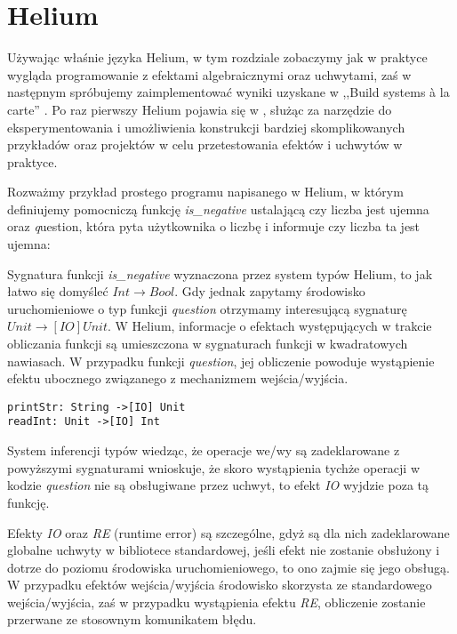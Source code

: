 \section{Helium}

\lstset{style=helium}

Używając właśnie języka Helium, w tym rozdziale zobaczymy jak w praktyce wygląda programowanie z efektami algebraicznymi oraz uchwytami, zaś w następnym spróbujemy zaimplementować wyniki uzyskane w ,,Build systems {\`a} la carte'' \cite{mokhov2018build, mokhov2020build}. Po raz pierwszy Helium pojawia się w \cite{biernacki2019abstracting}, służąc za narzędzie do eksperymentowania i umożliwienia konstrukcji bardziej skomplikowanych przykładów oraz projektów w celu przetestowania efektów i uchwytów w praktyce.

Rozważmy przykład prostego programu napisanego w Helium, w którym definiujemy pomocniczą funkcję \textit{is\_negative} ustalającą czy liczba jest ujemna oraz {\textit question}, która pyta użytkownika o liczbę i informuje czy liczba ta jest ujemna:



Sygnatura funkcji \textit{is\_negative} wyznaczona przez system typów Helium, to jak łatwo się domyśleć \(\mathit{Int \rightarrow Bool}\). Gdy jednak zapytamy środowisko uruchomieniowe o typ funkcji \textit{question} otrzymamy interesującą sygnaturę \(\mathit{Unit \rightarrow[IO] Unit}\). W Helium, informacje o efektach występujących w trakcie obliczania funkcji są umieszczona w sygnaturach funkcji w kwadratowych nawiasach. W przypadku funkcji \textit{question}, jej obliczenie powoduje wystąpienie efektu ubocznego związanego z mechanizmem wejścia/wyjścia. 

\begin{lstlisting}
printStr: String ->[IO] Unit
readInt: Unit ->[IO] Int
\end{lstlisting}

System inferencji typów wiedząc, że operacje we/wy są zadeklarowane z powyższymi sygnaturami wnioskuje, że skoro wystąpienia tychże operacji w kodzie \textit{question} nie są obsługiwane przez uchwyt, to efekt \textit{IO} wyjdzie poza tą funkcję.

Efekty \textit{IO} oraz \textit{RE} (runtime error) są szczególne, gdyż są dla nich zadeklarowane globalne uchwyty w bibliotece standardowej, jeśli efekt nie zostanie obsłużony i dotrze do poziomu środowiska uruchomieniowego, to ono zajmie się jego obsługą. W przypadku efektów wejścia/wyjścia środowisko skorzysta ze standardowego wejścia/wyjścia, zaś w przypadku wystąpienia efektu \textit{RE}, obliczenie zostanie przerwane ze stosownym komunikatem błędu.


